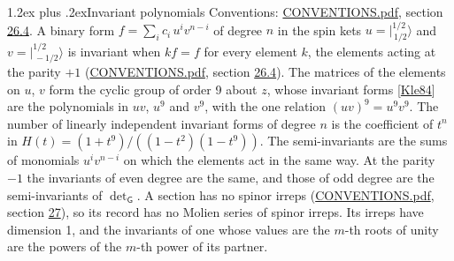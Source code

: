 \documentclass[10pt,a4paper]{article}
\makeatletter
\renewcommand\section{\@startsection{section}{1}{\z@}{-3ex plus -1ex minus -.2ex}%
  {1.2ex plus .2ex}{\normalfont\large\sffamily\bfseries\color{parttitle}}}
\numberwithin{equation}{section}
\newcommand{\grp}[1]{\mathsf{#1}}
\newcommand{\jm}[2]{\bigl\lvert{}^{#1}_{\,#2}\bigr\rangle}
\makeatother
\begin{document}
\section{Invariant polynomials}\label{s:invariants}
Conventions: \href{../../CONVENTIONS.pdf}{CONVENTIONS.pdf}, section \href{../../CONVENTIONS.pdf\#conv.26.4}{26.4}.
\leavevmode\label{n:local.spinor.uv}\label{n:local.binary.form}A binary form $f = \sum_i c_i\, u^i v^{n-i}$ of degree $n$ in the spin kets $u = \jm{1/2}{1/2}$ and $v = \jm{1/2}{-1/2}$ is invariant when $k f = f$ for every element $k$, the elements acting at the parity $+1$ (\href{../../CONVENTIONS.pdf}{CONVENTIONS.pdf}, section \href{../../CONVENTIONS.pdf\#conv.26.4}{26.4}).
The matrices of the elements on $u$, $v$ form the cyclic group of order 9 about $z$, whose invariant forms [\href{../../../REFERENCES.pdf\#ref.Kle84}{Kle84}] are the polynomials in $uv$, $u^{9}$ and $v^{9}$, with the one relation $(uv)^{9} = u^{9}v^{9}$. \label{n:function.hilbert}The number of linearly independent invariant forms of degree $n$ is the coefficient of $t^n$ in $H(t) = (1 + t^{9})/((1-t^{2})(1-t^{9}))$. The semi-invariants are the sums of monomials $u^i v^{n-i}$ on which the elements act in the same way. At the parity $-1$ the invariants of even degree are the same, and those of odd degree are the semi-invariants of $\det_{\grp{G}}$. A section has no spinor irreps (\href{../../CONVENTIONS.pdf}{CONVENTIONS.pdf}, section \href{../../CONVENTIONS.pdf\#conv.27}{27}), so its record has no Molien series of spinor irreps. Its irreps have dimension 1, and the invariants of one whose values are the $m$-th roots of unity are the powers of the $m$-th power of its partner.
\end{document}
